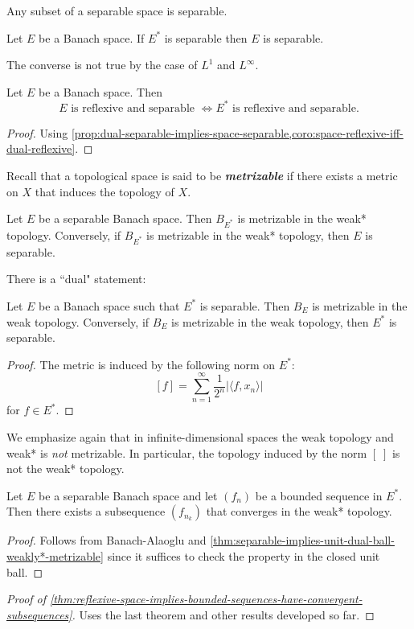\documentclass{article}
\theoremstyle{definition}
\numberwithin{equation}{section}
\begin{document}
\begin{prop}
	Any subset of a separable space is separable.
\end{prop}
\begin{prop}\label{prop:dual-separable-implies-space-separable}
	Let $E$ be a Banach space. If $E^*$ is separable then $E$ is separable.
\end{prop}
\begin{remark}
	The converse is not true by the case of $L^1$ and $L^\infty$.
\end{remark}
\begin{coro}
	Let $E$ be a Banach space. Then
	\[E \text{ is reflexive and separable }\iff E^*\text{ is reflexive and separable}.\]
\end{coro}
\begin{proof}
	Using \cref{prop:dual-separable-implies-space-separable,coro:space-reflexive-iff-dual-reflexive}.
\end{proof}
Recall that a topological space is said to be \textbf{\textit{metrizable}} if there exists a metric on $X$ that induces the topology of $X$.

\begin{thm}\label{thm:separable-implies-unit-dual-ball-weakly*-metrizable}
	Let $E$ be a separable Banach space. Then $B_{E^*}$ is metrizable in the weak* topology. Conversely, if $B_{E^*}$ is metrizable in the weak* topology, then $E$ is separable.
\end{thm}
There is a ``dual" statement:
\begin{thm}
	Let $E$ be a Banach space such that $E^*$ is separable. Then $B_E$ is metrizable in the weak topology. Conversely, if $B_E$ is metrizable in the weak topology,  then $E^*$ is separable.
\end{thm}
\begin{proof}
	The metric is induced by the following norm on $E^*$:
	\[[f]=\sum_{n=1}^\infty\frac{1}{2^n}|\langle f,x_n\rangle|\]
	for $f\in E^*$.
\end{proof}
\begin{remark}
	We emphasize again that in infinite-dimensional spaces the weak topology and weak* is \textit{not} metrizable. In particular, the topology induced by the norm $[\;]$ is not the weak* topology.
\end{remark}
\begin{coro}
	Let $E$ be a separable Banach space and let $(f_n)$ be a bounded sequence in $E^*$. Then there exists a subsequence $(f_{n_k})$ that converges in the weak* topology.
\end{coro}
\begin{proof}
	Follows from Banach-Alaoglu and \cref{thm:separable-implies-unit-dual-ball-weakly*-metrizable} since it suffices to check the property in the closed unit ball.
\end{proof}
\begin{proof}[Proof of \cref{thm:reflexive-space-implies-bounded-sequences-have-convergent-subsequences}]\label{proof:eflexive-space-implies-bounded-sequences-have-convergent-subsequences} {\color{orange} Uses the last theorem and other results developed so far.}
\end{proof}
\end{document}
